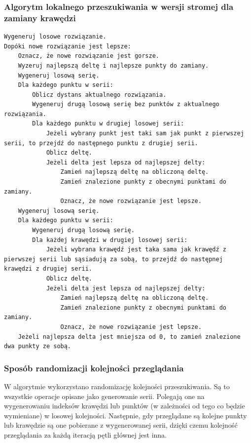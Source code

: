 \documentclass[a4paper]{article}
\begin{document}
\subsubsection{Algorytm lokalnego przeszukiwania w wersji stromej dla zamiany krawędzi}

\begin{lstlisting}
Wygeneruj losowe rozwiązanie.
Dopóki nowe rozwiązanie jest lepsze:
    Oznacz, że nowe rozwiązanie jest gorsze.
    Wyzeruj najlepszą deltę i najlepsze punkty do zamiany.
    Wygeneruj losową serię.
    Dla każdego punktu w serii:
        Oblicz dystans aktualnego rozwiązania.
        Wygeneruj drugą losową serię bez punktów z aktualnego rozwiązania.
        Dla każdego punktu w drugiej losowej serii:
            Jeżeli wybrany punkt jest taki sam jak punkt z pierwszej serii, to przejdź do następnego punktu z drugiej serii.
            Oblicz deltę.
            Jeżeli delta jest lepsza od najlepszej delty:
                Zamień najlepszą deltę na obliczoną deltę.
                Zamień znalezione punkty z obecnymi punktami do zamiany.
                Oznacz, że nowe rozwiązanie jest lepsze.
    Wygeneruj losową serię.
    Dla każdego punktu w serii:
        Wygeneruj drugą losową serię.
        Dla każdej krawędzi w drugiej losowej serii:
            Jeżeli wybrana krawędź jest taka sama jak krawędź z pierwszej serii lub sąsiadują za sobą, to przejdź do następnej krawędzi z drugiej serii.
            Oblicz deltę.
            Jeżeli delta jest lepsza od najlepszej delty:
                Zamień najlepszą deltę na obliczoną deltę.
                Zamień znalezione punkty z obecnymi punktami do zamiany.
                Oznacz, że nowe rozwiązanie jest lepsze.
    Jeżeli najlepsza delta jest mniejsza od 0, to zamień znalezione dwa punkty ze sobą.
\end{lstlisting}

\subsubsection{Sposób randomizacji kolejności przeglądania}

W algorytmie wykorzystano randomizację kolejności przeszukiwania. Są to wszystkie operacje opisane jako generowanie serii. Polegają one na wygenerowaniu indeksów krawędzi lub punktów (w zależności od tego co będzie wymieniane) w losowej kolejności. Następnie, gdy przeglądane są kolejne punkty lub krawędzie są one pobierane z wygenerowanej serii, dzięki czemu kolejność przeglądania za każdą iteracją pętli głównej jest inna. 
\end{document}
